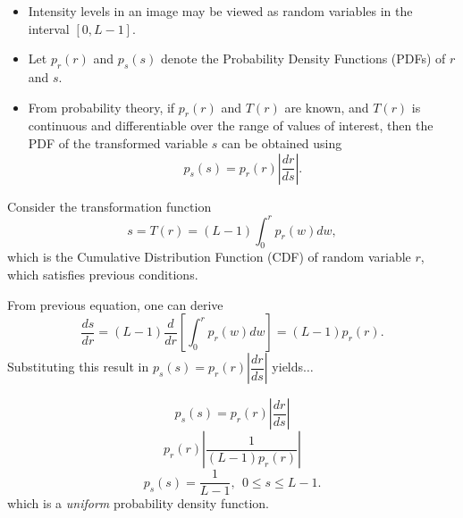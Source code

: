 \begin{frame}
\begin{itemize}
\item Intensity levels in an image may be viewed as random variables in the interval $[0,L-1]$.
\item Let $p_{r}(r)$ and $p_{s}(s)$ denote the Probability Density Functions (PDFs) of $r$ and $s$.
\item From probability
theory, if $p_{r}(r)$ and $T(r)$ are known, and $T(r)$ is continuous and differentiable over the range of values of interest, then the PDF of the transformed variable $s$ can be obtained using
\begin{equation}
p_{s}(s) = p_{r}(r) \left |\dfrac{dr}{ds} \right |.
\end{equation}
\end{itemize}
\end{frame}


\begin{frame}
Consider the transformation function
\begin{equation}
s = T(r) = \left (L - 1\right ) \int_{0}^{r} p_{r}(w) dw,
\end{equation}
which is the Cumulative Distribution Function (CDF) of random variable $r$, which satisfies previous conditions.

From previous equation, one can derive
\begin{equation}
\dfrac{ds}{dr} = (L-1) \dfrac{d}{dr} \left [ \int_{0}^{r} p_{r}(w) dw \right ] = (L-1)p_{r}(r).
\end{equation}
Substituting this result in $p_{s}(s) = p_{r}(r) \left |\dfrac{dr}{ds} \right |$ yields$\ldots$
\end{frame}


\begin{frame}
\[
p_{s}(s) = p_{r}(r) \left |\dfrac{dr}{ds} \right |
\]
\[
p_{r}(r) \left |\dfrac{1}{(L-1)p_{r}(r)} \right |
\]
\begin{equation}
\boxed{p_{s}(s) = \dfrac{1}{L-1}},\ \ 0 \leq s \leq L-1.
\end{equation}
which is a \textit{uniform} probability density function.
\end{frame}


